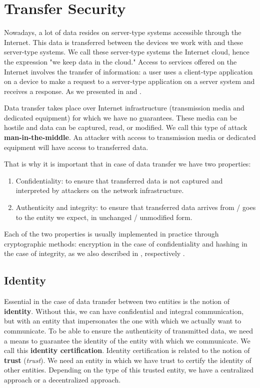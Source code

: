 \section{Transfer Security}
\label{sec:sec:transfer}

Nowadays, a lot of data resides on server-type systems accessible through the Internet.
This data is transferred between the devices we work with and these server-type systems.
We call these server-type systems the Internet cloud, hence the expression "we keep data in the cloud."
Access to services offered on the Internet involves the transfer of information: a user uses a client-type application on a device to make a request to a server-type application on a server system and receives a response.
As we presented in  and .

Data transfer takes place over Internet infrastructure (transmission media and dedicated equipment) for which we have no guarantees.
These media can be hostile and data can be captured, read, or modified.
We call this type of attack \textbf{man-in-the-middle}.
An attacker with access to transmission media or dedicated equipment will have access to transferred data.

That is why it is important that in case of data transfer we have two properties:

\begin{enumerate}
  \item Confidentiality: to ensure that transferred data is not captured and interpreted by attackers on the network infrastructure.
  \item Authenticity and integrity: to ensure that transferred data arrives from / goes to the entity we expect, in unchanged / unmodified form.
\end{enumerate}

Each of the two properties is usually implemented in practice through cryptographic methods: encryption in the case of confidentiality and hashing in the case of integrity, as we also described in , respectively .

\subsection{Identity}
\label{sec:sec:transfer:identity}

Essential in the case of data transfer between two entities is the notion of \textbf{identity}.
Without this, we can have confidential and integral communication, but with an entity that impersonates the one with which we actually want to communicate.
To be able to ensure the authenticity of transmitted data, we need a means to guarantee the identity of the entity with which we communicate.
We call this \textbf{identity certification}.
Identity certification is related to the notion of \textbf{trust} (\textit{trust}).
We need an entity in which we have trust to certify the identity of other entities.
Depending on the type of this trusted entity, we have a centralized approach or a decentralized approach.

